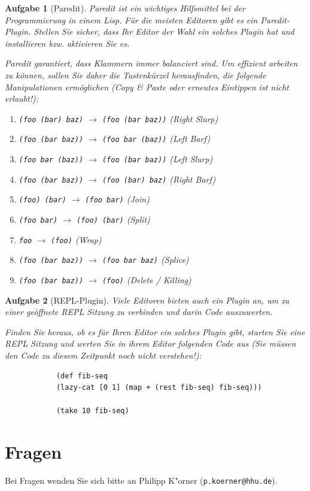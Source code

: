 \documentclass[11pt,a4paper]{article}
\newcounter{numb}
\theoremstyle{break}
\newtheorem{aufgabe}{Aufgabe}[numb]
\begin{document}
	
	\begin{aufgabe}[Paredit]
		Paredit ist ein wichtiges Hilfsmittel bei der Programmierung in einem Lisp.
		F\"ur die meisten Editoren gibt es ein Paredit-Plugin.
		Stellen Sie sicher, dass Ihr Editor der Wahl ein solches Plugin hat
		und installieren bzw. aktivieren Sie es.
		
		
		Paredit garantiert, dass Klammern immer balanciert sind.
		Um effizient arbeiten zu k\"onnen, sollen Sie daher
		die Tastenk\"urzel herausfinden, die folgende Manipulationen erm\"oglichen
		(Copy \& Paste oder erneutes Eintippen ist nicht erlaubt!):
		
		\begin{enumerate}[label=\alph*)]
			\item
			\texttt{(foo (bar) baz)} $\longrightarrow$ \texttt{(foo (bar baz))} \textit{(Right Slurp)}
			\item
			\texttt{(foo (bar baz))} $\longrightarrow$ \texttt{(foo bar (baz))} \textit{(Left Barf)}
			\item
			\texttt{(foo bar (baz))} $\longrightarrow$ \texttt{(foo (bar baz))} \textit{(Left Slurp)}
			\item
			\texttt{(foo (bar baz))} $\longrightarrow$ \texttt{(foo (bar) baz)} \textit{(Right Barf)}
			\item
			\texttt{(foo) (bar)} $\longrightarrow$ \texttt{(foo bar)} \textit{(Join)}
			\item
			\texttt{(foo bar)} $\longrightarrow$ \texttt{(foo) (bar)} \textit{(Split)}
			\item
			\texttt{foo} $\longrightarrow$ \texttt{(foo)} \textit{(Wrap)}
			\item
			\texttt{(foo (bar baz))} $\longrightarrow$ \texttt{(foo bar baz)} \textit{(Splice)}
			\item
			\texttt{(foo (bar baz))} $\longrightarrow$ \texttt{(foo)} \textit{(Delete / Killing)}
		\end{enumerate}
		
	\end{aufgabe}
	
	\begin{aufgabe}[REPL-Plugin]
		Viele Editoren bieten auch ein Plugin an,
		um zu einer ge\"offnete REPL Sitzung zu verbinden
		und darin Code auszuwerten.
		
		Finden Sie heraus, ob es f\"ur Ihren Editor ein solches Plugin gibt,
		starten Sie eine REPL Sitzung und werten Sie in ihrem Editor folgenden
		Code aus (Sie m\"ussen den Code zu diesem Zeitpunkt noch nicht verstehen!):
		
		\begin{verbatim}
			(def fib-seq
			(lazy-cat [0 1] (map + (rest fib-seq) fib-seq)))
			
			(take 10 fib-seq)
		\end{verbatim}
	\end{aufgabe}
	
	
	\section*{Fragen}
	Bei Fragen wenden Sie sich bitte an Philipp K"orner (\texttt{p.koerner@hhu.de}).
\end{document}
